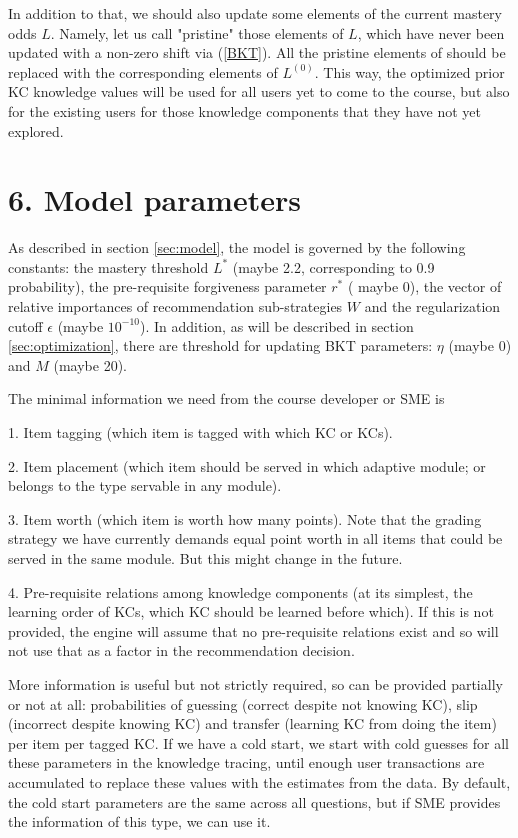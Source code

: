 \documentclass{sigchi}
\newcommand{\1}{\mathbf{1}}
\begin{document}
In addition to that, we should also update some elements of the current mastery odds $L$. Namely, let us call "pristine" those elements of $L$, which have never been updated with a non-zero shift via (\ref{BKT}). All the pristine elements of should be replaced with the corresponding elements of $L^{(0)}$. This way, the optimized prior KC knowledge values will be used for all users yet to come to the course, but also for the existing users for those knowledge components that they have not yet explored.

\section{6. Model parameters}
\label{sec:params_smes}
As described in section \ref{sec:model}, the model is governed by the following constants: the mastery threshold $L^*$ (maybe 2.2, corresponding to 0.9 probability), the pre-requisite forgiveness parameter $r^*$ ( maybe 0), the vector of relative importances of recommendation sub-strategies $W$ and the regularization cutoff $\epsilon$ (maybe $10^{-10}$). In addition, as will be described in section \ref{sec:optimization}, there are threshold for updating BKT parameters: $\eta$ (maybe 0) and $M$ (maybe 20).


The minimal information we need from the course developer or SME is

1. Item tagging (which item  is tagged with which KC or KCs).

2. Item placement (which item should be served in which adaptive module; or belongs to the type servable in any module).

3. Item worth (which item is worth how many points). Note that the grading strategy we have currently demands equal point worth in all items that could be served in the same module. But this might change in the future.

4. Pre-requisite relations among knowledge components (at its simplest, the learning order of KCs, which KC should be learned before which). If this is not provided, the engine will assume that no pre-requisite relations exist and so will not use that as a factor in the recommendation decision. 

More information is useful but not strictly required, so can be provided partially or not at all: probabilities of guessing (correct despite not knowing KC), slip (incorrect despite knowing KC)  and transfer (learning KC from doing the item) per item per tagged KC. If we have a cold start, we start with cold guesses for all these parameters in the knowledge tracing, until enough user transactions are accumulated to replace these values with the estimates from the data. By default, the cold start parameters are the same across all questions, but if SME provides the information of this type, we can use it.
\end{document}
